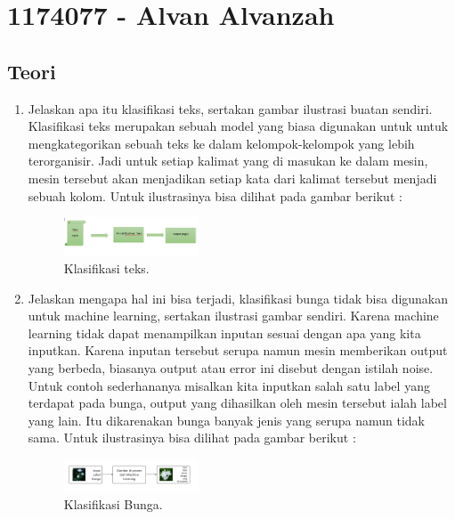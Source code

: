 \section{1174077 - Alvan Alvanzah}
\subsection{Teori}
\begin{enumerate}

	\item Jelaskan apa itu klasifikasi teks, sertakan gambar ilustrasi buatan sendiri.
	\hfill\break
	Klasifikasi teks merupakan sebuah model yang biasa digunakan untuk untuk mengkategorikan sebuah teks ke dalam kelompok-kelompok yang lebih terorganisir. Jadi untuk setiap kalimat yang di masukan ke dalam mesin, mesin tersebut akan menjadikan setiap kata dari kalimat tersebut menjadi sebuah kolom. Untuk ilustrasinya bisa dilihat pada gambar berikut : 

	\begin{figure}[H]
	\centering
		\includegraphics[width=4cm]{figures/1174077/4/materi/1.PNG}
		\caption{Klasifikasi teks.}
	\end{figure}

	\item Jelaskan mengapa hal ini bisa terjadi, klasifikasi bunga tidak bisa digunakan untuk machine learning, sertakan ilustrasi gambar sendiri.
	\hfill\break
	Karena machine learning tidak dapat menampilkan inputan sesuai dengan apa yang kita inputkan. Karena inputan tersebut serupa namun mesin memberikan output yang berbeda, biasanya output atau error ini disebut dengan istilah noise. Untuk contoh sederhananya misalkan kita inputkan salah satu label yang terdapat pada bunga, output yang dihasilkan oleh mesin tersebut ialah label yang lain. Itu dikarenakan bunga banyak jenis yang serupa namun tidak sama. Untuk ilustrasinya bisa dilihat pada gambar berikut : 

	\begin{figure}[H]
	\centering
		\includegraphics[width=4cm]{figures/1174077/4/materi/2.PNG}
		\caption{Klasifikasi Bunga.}
	\end{figure}
	

\end{enumerate}
